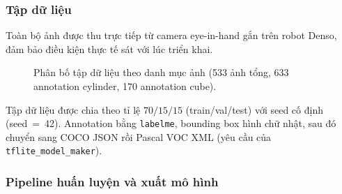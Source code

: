 \subsubsection*{Tập dữ liệu}

Toàn bộ ảnh được thu trực tiếp từ camera eye-in-hand gắn trên
robot Denso, đảm bảo điều kiện thực tế sát với lúc triển khai.

\begin{figure}[htbp]
  \centering
  \caption{Phân bố tập dữ liệu theo danh mục ảnh (533 ảnh tổng,
           633 annotation cylinder, 170 annotation cube).}
  \label{fig:ai3-dataset}
\end{figure}

Tập dữ liệu được chia theo tỉ lệ $70/15/15$ (train/val/test)
với seed cố định (seed~=~42). Annotation bằng \texttt{labelme},
bounding box hình chữ nhật, sau đó chuyển sang COCO JSON rồi
Pascal VOC XML (yêu cầu của \texttt{tflite\_model\_maker}).

\subsubsection*{Pipeline huấn luyện và xuất mô hình}

